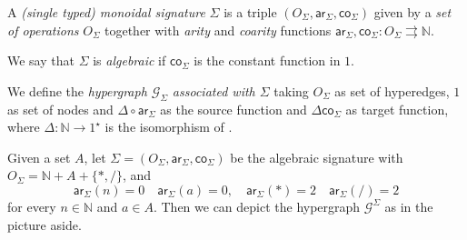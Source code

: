\documentclass[3p]{elsarticle}
\newcommand{\ari}{\mathsf{ar}}
\newcommand{\coar}{\mathsf{co}}
\theoremstyle{remark}
\theoremstyle{definition}
\begin{document}
\smallskip 
\noindent
\begin{minipage}[l]{.75\linewidth}
	\begin{defi}
		A \emph{(single typed) monoidal signature} $\Sigma$ is a triple $(O_\Sigma, \ari_\Sigma, \coar_\Sigma)$ given by a \emph{set of operations} $O_\Sigma$ together with \emph{arity} and \emph{coarity} functions $\ari_\Sigma, \coar_\Sigma\colon O_\Sigma \rightrightarrows \mathbb{N}$.  
		
		We say that $\Sigma$ is \emph{algebraic} if $\coar_{\Sigma}$ is the constant function in $1$.
		
		We define the \emph{hypergraph $\mathcal{G}_\Sigma$ associated with $\Sigma$} taking $O_\Sigma$ as set of hyperedges, $1$ as set of nodes and $\Delta \circ \ari_\Sigma$ as the source function and $ \Delta \coar_{\Sigma}$ as target function, where $\Delta \colon \mathbb{N}\to 1^\star$ is the isomorphism of .
	\end{defi}
	
	\begin{exa}\label{exa_3} 
		Given a set $A$, let $\Sigma = (O_\Sigma, \ari_\Sigma, \coar_{\Sigma})$ be the algebraic signature with $O_\Sigma =  \mathbb{N} + A + \{*, /\}$, 
		and 
		\[\ari_\Sigma(n)=0 \quad \ari_\Sigma(a) = 0, \quad \ari_\Sigma(*) =2 \quad  \ari_\Sigma(/) = 2\]
		for every $n\in \mathbb{N}$ and $a\in A$. Then we can depict the hypergraph $\mathcal{G}^\Sigma$  as in the picture aside.
	\end{exa}
	\end{minipage}
	\hfill
\end{document}
